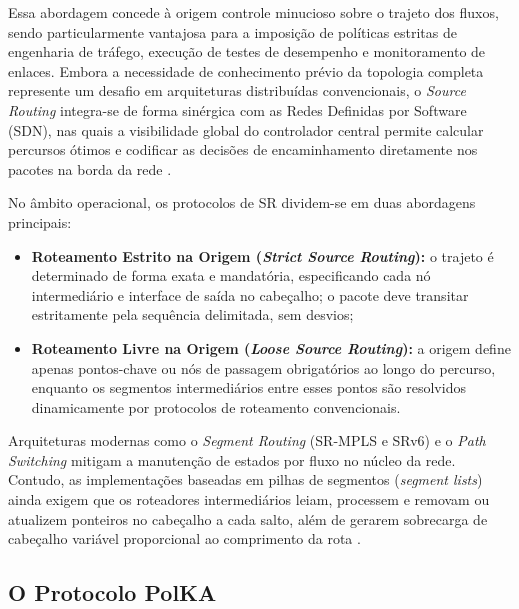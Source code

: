 Essa abordagem concede à origem controle minucioso sobre o trajeto dos fluxos, sendo particularmente vantajosa para a imposição de políticas estritas de engenharia de tráfego, execução de testes de desempenho e monitoramento de enlaces. Embora a necessidade de conhecimento prévio da topologia completa represente um desafio em arquiteturas distribuídas convencionais, o \textit{Source Routing} integra-se de forma sinérgica com as Redes Definidas por Software (SDN), nas quais a visibilidade global do controlador central permite calcular percursos ótimos e codificar as decisões de encaminhamento diretamente nos pacotes na borda da rede \cite{ventre2020segment}.

No âmbito operacional, os protocolos de SR dividem-se em duas abordagens principais:
\begin{itemize}
    \item \textbf{Roteamento Estrito na Origem (\textit{Strict Source Routing}):} o trajeto é determinado de forma exata e mandatória, especificando cada nó intermediário e interface de saída no cabeçalho; o pacote deve transitar estritamente pela sequência delimitada, sem desvios;
    \item \textbf{Roteamento Livre na Origem (\textit{Loose Source Routing}):} a origem define apenas pontos-chave ou nós de passagem obrigatórios ao longo do percurso, enquanto os segmentos intermediários entre esses pontos são resolvidos dinamicamente por protocolos de roteamento convencionais.
\end{itemize}

Arquiteturas modernas como o \textit{Segment Routing} (SR-MPLS e SRv6) \cite{rfc8402, ventre2020segment} e o \textit{Path Switching} \cite{hari2015pathswitching} mitigam a manutenção de estados por fluxo no núcleo da rede. Contudo, as implementações baseadas em pilhas de segmentos (\textit{segment lists}) ainda exigem que os roteadores intermediários leiam, processem e removam ou atualizem ponteiros no cabeçalho a cada salto, além de gerarem sobrecarga de cabeçalho variável proporcional ao comprimento da rota \cite{dominicini2020}.

\subsection{O Protocolo PolKA}
\label{subsec:protocolo_polka}

